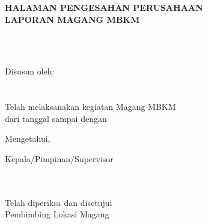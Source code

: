 \newpage

\begin{center}
    \begin{doublespace}
        \textbf{\large \MakeUppercase{Halaman Pengesahan Perusahaan \\ Laporan Magang MBKM}}
    \end{doublespace}
\end{center}

\begin{center}
    \textbf{\large \MakeUppercase {\normalsize{\judulid}}} \\
    \textbf{\large \MakeUppercase {\normalsize{\tempat}}} \\ [5cm]
\end{center}

\begin{center}
    Disusun oleh:\\
    \textbf{\underline{\penulis}}\\
    \textbf{\nim}\\[4cm]

    Telah melaksanakan kegiatan Magang MBKM \\
    dari tanggal \textbf{\tglMulai} sampai dengan \textbf{\tglSelesai} \\ [2cm]
\end{center}

\begin{center}
    Mengetahui, \\[1cm]
\end{center}
\begin{minipage}{0.45\textwidth}
    Kepala/Pimpinan/Supervisor\\
    \tempat\\[2cm]
    \underline{\pimpinanPerusahaan}\\
    \jabatanPimpinan
\end{minipage}%
\hfill
 \begin{minipage}{0.35\textwidth}
    Telah diperiksa dan disetujui \\
    Pembimbing Lokasi Magang \\[2cm]
    \underline{\pembimbingPerusahaan}\\
    \jabatanPembimbing
\end{minipage}